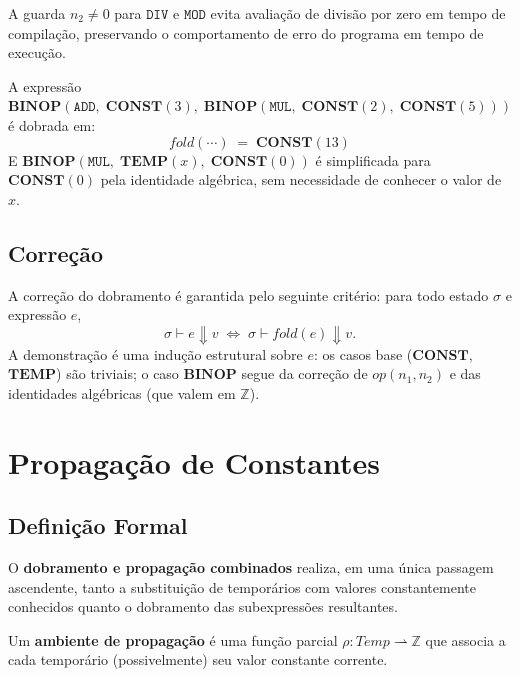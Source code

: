 \begin{remark}
  A guarda $n_2 \neq 0$ para $\mathtt{DIV}$ e $\mathtt{MOD}$ evita avaliação
  de divisão por zero em tempo de compilação, preservando o comportamento de
  erro do programa em tempo de execução.
\end{remark}

\begin{example}
  A expressão $\mathbf{BINOP}(\mathtt{ADD},\; \mathbf{CONST}(3),\;
  \mathbf{BINOP}(\mathtt{MUL},\; \mathbf{CONST}(2),\; \mathbf{CONST}(5)))$
  é dobrada em:
  \[
    \mathit{fold}(\cdots) \;=\; \mathbf{CONST}(13)
  \]
  E $\mathbf{BINOP}(\mathtt{MUL},\; \mathbf{TEMP}(x),\; \mathbf{CONST}(0))$
  é simplificada para $\mathbf{CONST}(0)$ pela identidade algébrica, sem
  necessidade de conhecer o valor de $x$.
\end{example}

\subsection{Correção}

A correção do dobramento é garantida pelo seguinte critério: para todo estado
$\sigma$ e expressão $e$,
\[
  \sigma \vdash e \Downarrow v \;\iff\; \sigma \vdash
  \mathit{fold}(e) \Downarrow v.
\]
A demonstração é uma indução estrutural sobre $e$: os casos base
($\mathbf{CONST}$,
$\mathbf{TEMP}$) são triviais; o caso $\mathbf{BINOP}$ segue da correção de
$\mathit{op}(n_1, n_2)$ e das identidades algébricas (que valem em
$\mathbb{Z}$).

\section{Propagação de Constantes}\label{sec:opt-prop}

\subsection{Definição Formal}

O \textbf{dobramento e propagação combinados} realiza, em uma única passagem
ascendente, tanto a substituição de temporários com valores constantemente
conhecidos quanto o dobramento das subexpressões resultantes.

\begin{Definition}\label{def:prop-env}
  Um \textbf{ambiente de propagação} é uma função parcial
  $\rho : \mathit{Temp} \rightharpoonup \mathbb{Z}$
  que associa a cada temporário (possivelmente) seu valor constante corrente.
\end{Definition}

